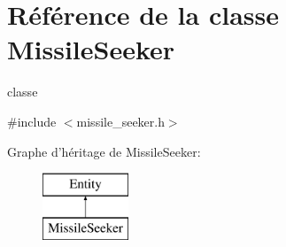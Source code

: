 \hypertarget{class_missile_seeker}{\section{Référence de la classe Missile\+Seeker}
\label{class_missile_seeker}
}


classe  




{\ttfamily \#include $<$missile\+\_\+seeker.\+h$>$}

Graphe d'héritage de Missile\+Seeker\+:\begin{figure}[H]
\begin{center}
\leavevmode
\includegraphics[height=2.000000cm]{class_missile_seeker}
\end{center}
\end{figure}
